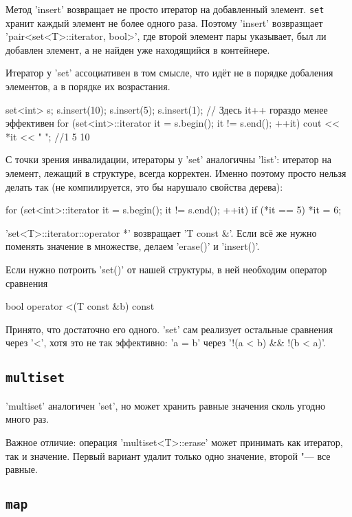 Метод \cpp'insert' возвращает не просто итератор на добавленный элемент.
\verb'set' хранит каждый элемент не более одного раза.
Поэтому \cpp'insert' возвразщает \cpp'pair<set<T>::iterator, bool>', где второй элемент пары указывает, 
был ли добавлен элемент, а не найден уже находящийся в контейнере.

Итератор у \cpp'set' ассоциативен в том смысле, что идёт не в порядке добаления элементов, а в порядке их возрастания.
\begin{cppcode}
set<int> s;
s.insert(10);
s.insert(5);
s.insert(1);
// Здесь it++ гораздо менее эффективен
for (set<int>::iterator it = s.begin(); it != s.end(); ++it)
	cout << *it << " "; //1 5 10
\end{cppcode}

С точки зрения инвалидации, итераторы у \cpp'set' аналогичны \cpp'list': итератор на элемент, лежащий в структуре, всегда корректен.
Именно поэтому просто нельзя делать так (не компилируется, это бы нарушало свойства дерева):
\begin{cppcode}
for (set<int>::iterator it = s.begin(); it != s.end(); ++it)
	if (*it == 5)
		*it = 6;
\end{cppcode}
\cpp'set<T>::iterator::operator *' возвращает \cpp'T const &'.
Если всё же нужно поменять значение в множестве, делаем \cpp'erase()' и \cpp'insert()'.

Если нужно потроить \cpp'set()' от нашей структуры, в ней необходим оператор сравнения
\begin{cppcode}
bool operator <(T const &b) const
\end{cppcode}
Принято, что достаточно его одного. \cpp'set' сам реализует остальные сравнения через \cpp'<', хотя это не так эффективно:
\cpp'a = b' через \cpp'!(a < b) && !(b < a)'.

\subsection{\texttt{multiset}}

\cpp'multiset' аналогичен \cpp'set', но может хранить равные значения сколь угодно много раз.

Важное отличие: операция \cpp'multiset<T>::erase' может принимать как итератор, так и значение. Первый вариант удалит только одно значение, второй "--- все равные.

\subsection{\texttt{map}}

